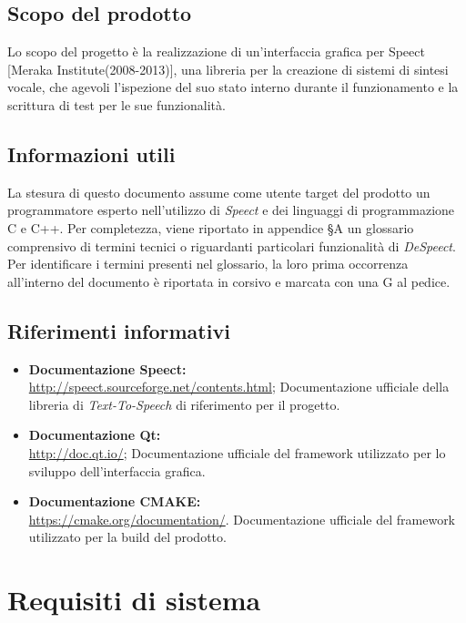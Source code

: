 \documentclass[openany,12pt,a4paper]{report}
\begin{document}
	\section{Scopo del prodotto}
	
	Lo scopo del progetto è la realizzazione di un’interfaccia grafica per \Gls{Speect} [Meraka Institute(2008-2013)], una libreria per la creazione di sistemi di sintesi vocale, che agevoli l’ispezione del suo stato interno durante il funzionamento e la scrittura di test per le sue funzionalità.
	
	\section{Informazioni utili}
	
	La stesura di questo documento assume come utente target del prodotto un programmatore esperto nell'utilizzo di \textit{Speect} e dei linguaggi di programmazione C e C++.
	Per completezza, viene riportato in appendice §A un glossario comprensivo di termini tecnici o riguardanti particolari funzionalità di \textit{DeSpeect}. Per identificare i termini
	presenti nel glossario, la loro prima occorrenza all’interno del documento è riportata in corsivo e
	marcata con una G al pedice.
	
	\section{Riferimenti informativi}
	
	\begin{itemize}
		\item \textbf{Documentazione Speect:} \\
		\url{http://speect.sourceforge.net/contents.html};
		\subitem Documentazione ufficiale della libreria di \textit{Text-To-Speech} di riferimento per il progetto.
		
		\item \textbf{Documentazione Qt:} \\
		\url{http://doc.qt.io/};
		\subitem Documentazione ufficiale del framework utilizzato per lo sviluppo dell'interfaccia grafica.
		
		\item \textbf{Documentazione CMAKE:} \\
		\url{https://cmake.org/documentation/}.
		\subitem Documentazione ufficiale del framework utilizzato per la build del prodotto. 
	\end{itemize}

	\chapter{Requisiti di sistema}
	
\end{document}
